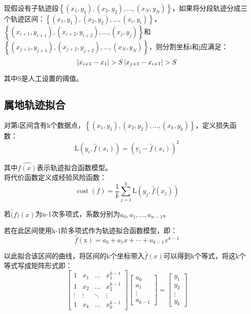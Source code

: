 现假设有子轨迹段$\left\{\left(x_{1}, y_{1}\right),\left(x_{2}, y_{2}\right), \dots,\left(x_{N}, y_{N}\right)\right\}$，如果将分段轨迹分成三个轨迹区间：$\left\{\left(x_{1}, y_{1}\right),\left(x_{2}, y_{2}\right), \dots,\left(x_{i}, y_{i}\right)\right\}$，$\left\{\left(x_{i+1}, y_{i+1}\right),\left(x_{i+2}, y_{i+2}\right), \ldots,\left(x_{j}, y_{j}\right)\right\}$和$\left\{\left(x_{j+1}, y_{j+1}\right),\left(x_{j+2}, y_{j+2}\right), \dots,\left(x_{N}, y_{N}\right)\right\}$，则分割坐标i和j应满足：
\[
\left|x_{i+1}-x_{1}\right|>S\\
\left|x_{j+1}-x_{i+1}\right|>S
\]

其中S是人工设置的阈值。

\subsection{属地轨迹拟合}
对第i区间含有k个数据点，$\left\{\left(x_{1}, y_{1}\right),\left(x_{2}, y_{2}\right), \ldots,\left(x_{k}, y_{k}\right)\right\}$，定义损失函数：
\[
\mathrm{L}\left(y_{i}, \hat{f}\left(x_{i}\right)\right)=\left(\mathrm{y_i}-\hat{f}\left(x_{i}\right)\right)^{2}
\]

其中$\hat{f(x)}$表示轨迹拟合函数模型。\\
将代价函数定义成经验风险函数：
\begin{equation}
\label{ch3costwithoutl1}
\operatorname{cost}(f)=\frac{1}{k} \sum_{j=1}^{k} \mathrm{L}\left(y_{j}, \hat{f}\left(x_{j}\right)\right)
\end{equation}

若$\hat(f)(x)$为n-1次多项式，系数分别为$a_0,a_1,…,a_{n-1}$。

若在此区间使用k-1阶多项式作为轨迹拟合函数模型，即：
\[
\hat{f}\left( \text{x} \right) =a_0+a_1x+\cdots +a_{k-1}x^{k-1}
\]

以此拟合该区间的曲线，将区间的k个坐标带入$\hat{f}(x)$可以得到k个等式，将这k个等式写成矩阵形式即：
\[
\left[\begin{array}{cccc}
{1} & {x_{1}} & {\dots} & {x_{1}^{k-1}} \\
{1} & {x_{2}} & {\dots} & {x_{2}^{k-1}} \\
{\vdots} & {\vdots} & {\ddots} & {\vdots} \\
{1} & {x_{k}} & {\dots} & {x_{k}^{k-1}}
\end{array}\right]\left[\begin{array}{c}
{a_{0}} \\
{a_{1}} \\
{\vdots} \\
{a_{k-1}}
\end{array}\right]=\left[\begin{array}{c}
{y_{1}} \\
{y_{2}} \\
{\vdots} \\
{y_{k}}
\end{array}\right]
\]

